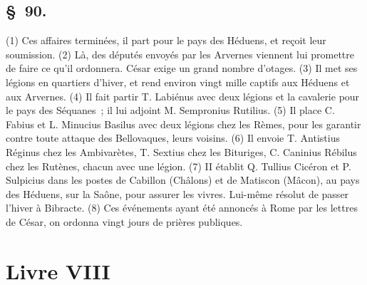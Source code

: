 \documentclass[french,twoside]{book} %
\begin{document}
\subsection[{§ 90.}]{ \textsc{§ 90.} }
\noindent (1) Ces affaires terminées, il part pour le pays des Héduens, et reçoit leur soumission. (2) Là, des députés envoyés par les Arvernes viennent lui promettre de faire ce qu’il ordonnera. César exige un grand nombre d’otages. (3) Il met ses légions en quartiers d’hiver, et rend environ vingt mille captifs aux Héduens et aux Arvernes. (4) Il fait partir T. Labiénus avec deux légions et la cavalerie pour le pays des Séquanes ; il lui adjoint M. Sempronius Rutilius. (5) Il place C. Fabius et L. Minucius Basilus avec deux légions chez les Rèmes, pour les garantir contre toute attaque des Bellovaques, leurs voisins. (6) Il envoie T. Antistius Réginus chez les Ambivarètes, T. Sextius chez les Bituriges, C. Caninius Rébilus chez les Rutènes, chacun avec une légion. (7) II établit Q. Tullius Cicéron et P. Sulpicius dans les postes de Cabillon (Châlons) et de Matiscon (Mâcon), au pays des Héduens, sur la Saône, pour assurer les vivres. Lui-même résolut de passer l’hiver à Bibracte. (8) Ces événements ayant été annoncés à Rome par les lettres de César, on ordonna vingt jours de prières publiques.
\section[{Livre VIII}]{Livre VIII}\renewcommand{\leftmark}{Livre VIII}
\end{document}
